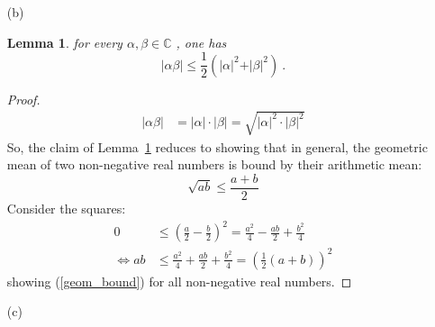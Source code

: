 \documentclass[12pt, reqno]{article}
\newtheorem{lemma}[theorem]{Lemma}
\theoremstyle{definition}
\theoremstyle{remark}
\newcommand{\ud}{\mathrm{d}}
\begin{document}
\begin{itemize}


\vspace{0.1 cm}
\item[(b)] 

\begin{lemma} \label{two_b}
for every $\alpha, \beta \in \mathbb{C}$ , one has
\begin{equation} \label{geom_bound}
\vert \alpha \beta \vert \leq \frac{1}{2} \left( \vert \alpha \vert^2 + \vert \beta \vert^2 \right) ~\mbox{.}
\end{equation}
\end{lemma}

\begin{proof}
    \begin{align*}
        |\alpha \beta|&= |\alpha|\cdot|\beta|= \sqrt{|\alpha|^{2}\cdot|\beta|^{2}}\end{align*}
        So, the claim of Lemma~\ref{two_b} reduces to showing that in general, the geometric mean of two non-negative real numbers is bound by their arithmetic mean:
        \begin{equation}\sqrt{ab}\le \frac{a+b}{2}\end{equation}
        Consider the squares:
        \begin{align*}
        0&\le  \left(\frac{a}{2}- \frac{b}{2}\right)^{2}=\frac{a^{2}}{4} - \frac{ab}{2}+ \frac{b^{2}}{4}\\
        \iff ab&\le \frac{a^{2}}{4}+ \frac{ab}{2}+ \frac{b^{2}}{4}=\left(\frac{1}{2}(a+b)\right)^{2}
        \end{align*}
        showing (\ref{geom_bound}) for all non-negative real numbers. 
\end{proof}

\vspace{0.1 cm}
\item[(c)] 


\end{itemize}
\end{document}
